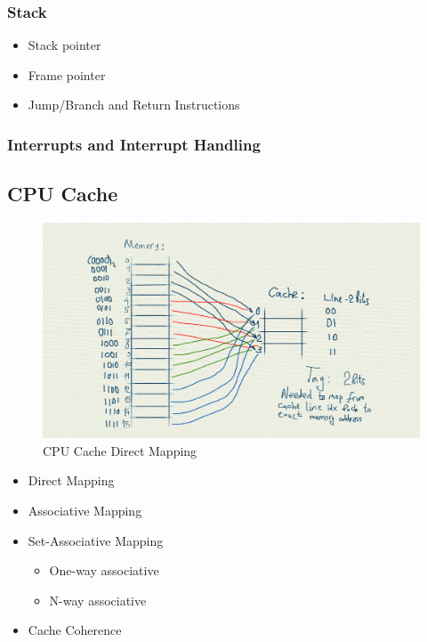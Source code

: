 \documentclass[12pt,a4paper]{article}
\begin{document}
\subsubsection{Stack}

\begin{itemize}
\item Stack pointer
\item Frame pointer
\item Jump/Branch and Return Instructions
\end{itemize}

\subsubsection{Interrupts and Interrupt Handling}

\subsection{CPU Cache}

\begin{figure}[H]
\begin{center}
\includegraphics[width=1\textwidth]{png/cache-direct.png}
\caption{CPU Cache Direct Mapping}\label{fig.cache-direct-mapping}
\end{center}
\end{figure}

\begin{itemize}
\item Direct Mapping
\item Associative Mapping
\item Set-Associative Mapping

    \begin{itemize}
    \item One-way associative
    \item N-way associative
    \end{itemize}

\item Cache Coherence
\end{itemize}
\end{document}
